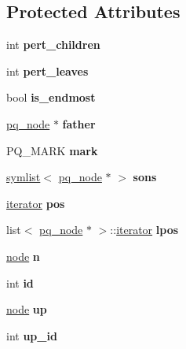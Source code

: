\subsection*{Protected Attributes}
\begin{DoxyCompactItemize}
\item 
\mbox{\label{classpq__node_a8d8fb7b3059e7aeecf62eeed34076afb}} 
int {\bfseries pert\+\_\+children}
\item 
\mbox{\label{classpq__node_a3fb78609f93f41efd6826ed3169fc312}} 
int {\bfseries pert\+\_\+leaves}
\item 
\mbox{\label{classpq__node_a058dda3d1197dfd2b343d1983d305d79}} 
bool {\bfseries is\+\_\+endmost}
\item 
\mbox{\label{classpq__node_a3e7c886498c76c633f057fb42ff9c435}} 
\mbox{\hyperlink{classpq__node}{pq\+\_\+node}} $\ast$ {\bfseries father}
\item 
\mbox{\label{classpq__node_aee913582a7b268ce2570bee8a8367c50}} 
P\+Q\+\_\+\+M\+A\+RK {\bfseries mark}
\item 
\mbox{\label{classpq__node_a2cc030cfa4560872acea8b50ebd0542b}} 
\mbox{\hyperlink{classsymlist}{symlist}}$<$ \mbox{\hyperlink{classpq__node}{pq\+\_\+node}} $\ast$ $>$ {\bfseries sons}
\item 
\mbox{\label{classpq__node_a5e8a5defa0fec4ff2e82fabee97296b4}} 
\mbox{\hyperlink{structsymlist__iterator}{iterator}} {\bfseries pos}
\item 
\mbox{\label{classpq__node_a7eefcc531576365b720be9a28974b7b9}} 
list$<$ \mbox{\hyperlink{classpq__node}{pq\+\_\+node}} $\ast$ $>$\+::\mbox{\hyperlink{structsymlist__iterator}{iterator}} {\bfseries lpos}
\item 
\mbox{\label{classpq__node_a4997fd09a95d9a659b99cea04197740a}} 
\mbox{\hyperlink{classnode}{node}} {\bfseries n}
\item 
\mbox{\label{classpq__node_ad0034c1f93c3c77edb6d3a03f25aba06}} 
int {\bfseries id}
\item 
\mbox{\label{classpq__node_ae6d5a236397b9a57159487eac7ec168d}} 
\mbox{\hyperlink{classnode}{node}} {\bfseries up}
\item 
\mbox{\label{classpq__node_a5a7bcdde1f57191a77a6a14994b38a50}} 
int {\bfseries up\+\_\+id}
\end{DoxyCompactItemize}

